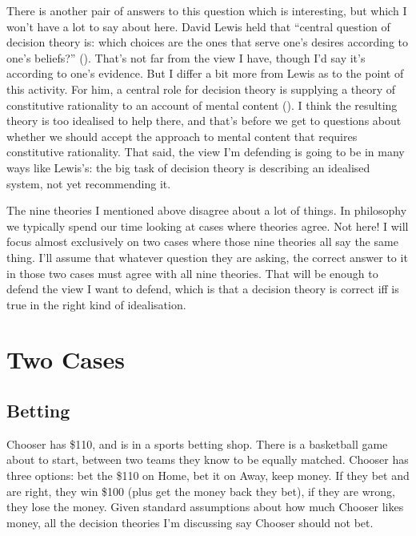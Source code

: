 \documentclass[
  11pt,
  letterpaper,
  DIV=11,
  numbers=noendperiod,
  twoside]{scrartcl}
\begin{document}
There is another pair of answers to this question which is interesting,
but which I won't have a lot to say about here. David Lewis held that
``central question of decision theory is: which choices are the ones
that serve one's desires according to one's beliefs?''
().
That's not far from the view I have, though I'd say it's according to
one's evidence. But I differ a bit more from Lewis as to the point of
this activity. For him, a central role for decision theory is supplying
a theory of constitutive rationality to an account of mental content
(). I think the resulting
theory is too idealised to help there, and that's before we get to
questions about whether we should accept the approach to mental content
that requires constitutive rationality. That said, the view I'm
defending is going to be in many ways like Lewis's: the big task of
decision theory is describing an idealised system, not yet recommending
it.

The nine theories I mentioned above disagree about a lot of things. In
philosophy we typically spend our time looking at cases where theories
agree. Not here! I will focus almost exclusively on two cases where
those nine theories all say the same thing. I'll assume that whatever
question they are asking, the correct answer to it in those two cases
must agree with all nine theories. That will be enough to defend the
view I want to defend, which is that a decision theory is correct iff is
true in the right kind of idealisation.

\section{Two Cases}\label{two-cases}

\subsection{Betting}\label{betting}

Chooser has \$110, and is in a sports betting shop. There is a
basketball game about to start, between two teams they know to be
equally matched. Chooser has three options: bet the \$110 on Home, bet
it on Away, keep money. If they bet and are right, they win \$100 (plus
get the money back they bet), if they are wrong, they lose the money.
Given standard assumptions about how much Chooser likes money, all the
decision theories I'm discussing say Chooser should not bet.
\end{document}
